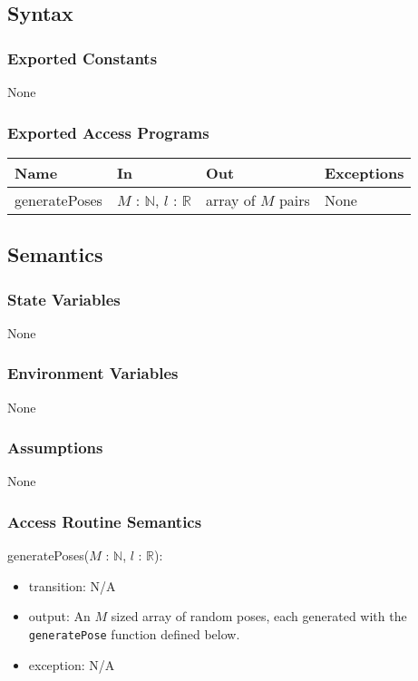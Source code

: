 \documentclass[12pt, titlepage]{article}
\begin{document}
\subsection{Syntax}

\subsubsection{Exported Constants}
None

\subsubsection{Exported Access Programs}
\begin{center}
\begin{tabular}{p{3cm} p{4cm} p{4cm} p{3cm}}
\hline
\textbf{Name} & \textbf{In} & \textbf{Out} & \textbf{Exceptions} \\
\hline
generatePoses & $M$ : $\mathbb{N}$, $l$ : $\mathbb{R}$ & array of $M$ pairs & None \\
\hline
\end{tabular}
\end{center}

\subsection{Semantics}

\subsubsection{State Variables}
None

\subsubsection{Environment Variables}
None

\subsubsection{Assumptions}
None 

\subsubsection{Access Routine Semantics}

\noindent generatePoses($M$ : $\mathbb{N}$, $l$ : $\mathbb{R}$):
\begin{itemize}
\item transition: N/A
\item output: An $M$ sized array of random poses, each generated with the \texttt{generatePose} function defined below.
\item exception: N/A
\end{itemize}
\end{document}

